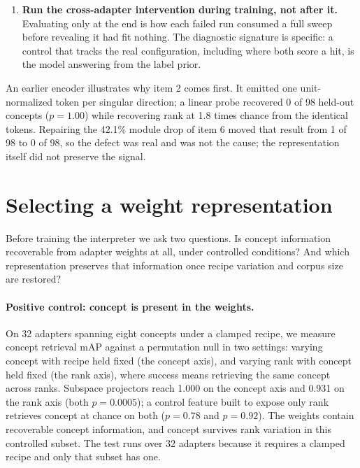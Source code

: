 \documentclass{article}
\begin{document}
\begin{enumerate}
silently dropped the same 34 of 50 modules from every adapter while the configuration looked
correct; a name-based dimension rule discarded 42.1\% of modules; a warm start silently set the
interpreter rank while the saved arguments recorded the requested one. Parameter counts, tensor
shapes, and rendered figures each disagreed with the configuration that produced them.
\item \textbf{Run the cross-adapter intervention during training, not after it.} Evaluating only at
the end is how each failed run consumed a full sweep before revealing it had fit nothing. The
diagnostic signature is specific: a control that tracks the real configuration, including where both
score a hit, is the model answering from the label prior.
\end{enumerate}

An earlier encoder illustrates why item 2 comes first. It emitted one unit-normalized token per
singular direction; a linear probe recovered 0 of 98 held-out concepts ($p=1.00$) while recovering
rank at 1.8 times chance from the identical tokens. Repairing the 42.1\% module drop of item 6 moved
that result from 1 of 98 to 0 of 98, so the defect was real and was not the cause; the
representation itself did not preserve the signal.

\section{Selecting a weight representation}
\label{app:encoder}

Before training the interpreter we ask two questions. Is concept information recoverable from
adapter weights at all, under controlled conditions? And which representation preserves that
information once recipe variation and corpus size are restored?

\paragraph{Positive control: concept is present in the weights.}
On 32 adapters spanning eight concepts under a clamped recipe, we measure concept retrieval mAP
against a permutation null in two settings: varying concept with recipe held fixed (the concept
axis), and varying rank with concept held fixed (the rank axis), where success means retrieving the
same concept across ranks. Subspace projectors reach 1.000 on the concept axis and 0.931 on the rank
axis (both $p=0.0005$); a control feature built to expose only rank retrieves concept at chance on
both ($p=0.78$ and $p=0.92$). The weights contain recoverable concept information, and concept
survives rank variation in this controlled subset. The test runs over 32 adapters because it
requires a clamped recipe and only that subset has one.
\end{document}
